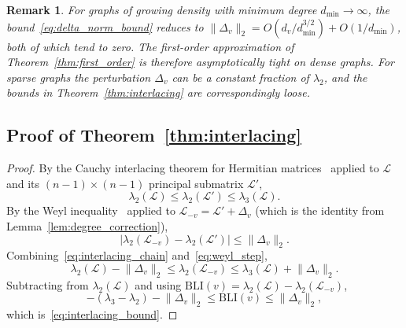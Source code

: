 \documentclass[12pt, a4paper]{article}
\newtheorem*{remark}{Remark}
\begin{document}
\begin{remark}
For graphs of growing density with minimum degree $d_{\min} \to \infty$, the bound~\eqref{eq:delta_norm_bound} reduces to $\lVert \Delta_v \rVert_2 = O(d_v / d_{\min}^{3/2}) + O(1/d_{\min})$, both of which tend to zero. The first-order approximation of Theorem~\ref{thm:first_order} is therefore asymptotically tight on dense graphs. For sparse graphs the perturbation $\Delta_v$ can be a constant fraction of $\lambda_2$, and the bounds in Theorem~\ref{thm:interlacing} are correspondingly loose.
\end{remark}

\subsection{Proof of Theorem~\ref{thm:interlacing}}\label{app:bli_interlacing_proof}

\begin{proof}
By the Cauchy interlacing theorem for Hermitian matrices~\citep[Theorem 4.3.28]{horn2012matrix} applied to $\mathcal{L}$ and its $(n-1) \times (n-1)$ principal submatrix $\mathcal{L}'$,
\begin{equation}\label{eq:interlacing_chain}
\lambda_2(\mathcal{L}) \leq \lambda_2(\mathcal{L}') \leq \lambda_3(\mathcal{L}).
\end{equation}
By the Weyl inequality~\citep[Theorem 4.3.1]{horn2012matrix} applied to $\mathcal{L}_{-v} = \mathcal{L}' + \Delta_v$ (which is the identity from Lemma~\ref{lem:degree_correction}),
\begin{equation}\label{eq:weyl_step}
\lvert \lambda_2(\mathcal{L}_{-v}) - \lambda_2(\mathcal{L}') \rvert \leq \lVert \Delta_v \rVert_2.
\end{equation}
Combining~\eqref{eq:interlacing_chain} and~\eqref{eq:weyl_step},
\begin{equation}
\lambda_2(\mathcal{L}) - \lVert \Delta_v \rVert_2 \leq \lambda_2(\mathcal{L}_{-v}) \leq \lambda_3(\mathcal{L}) + \lVert \Delta_v \rVert_2.
\end{equation}
Subtracting from $\lambda_2(\mathcal{L})$ and using $\mathrm{BLI}(v) = \lambda_2(\mathcal{L}) - \lambda_2(\mathcal{L}_{-v})$,
\begin{equation}
-(\lambda_3 - \lambda_2) - \lVert \Delta_v \rVert_2 \leq \mathrm{BLI}(v) \leq \lVert \Delta_v \rVert_2,
\end{equation}
which is~\eqref{eq:interlacing_bound}.
\end{proof}
\end{document}

